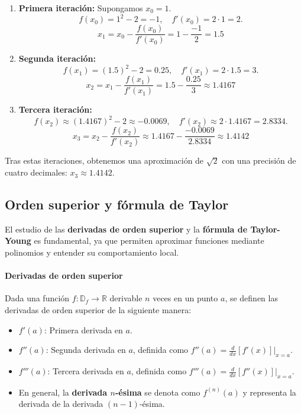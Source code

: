 \documentclass[12pt, a4paper]{article}
\theoremstyle{rioplatense}
\begin{document}
\begin{enumerate}
    \item \textbf{Primera iteración:}
    Supongamos \( x_0 = 1 \).
    \[
    f(x_0) = 1^2 - 2 = -1, \quad f'(x_0) = 2 \cdot 1 = 2.
    \]
    \[
    x_1 = x_0 - \frac{f(x_0)}{f'(x_0)} = 1 - \frac{-1}{2} = 1.5
    \]

    \item \textbf{Segunda iteración:}
    \[
    f(x_1) = (1.5)^2 - 2 = 0.25, \quad f'(x_1) = 2 \cdot 1.5 = 3.
    \]
    \[
    x_2 = x_1 - \frac{f(x_1)}{f'(x_1)} = 1.5 - \frac{0.25}{3} \approx 1.4167
    \]

    \item \textbf{Tercera iteración:}
    \[
    f(x_2) \approx (1.4167)^2 - 2 \approx -0.0069, \quad f'(x_2) \approx 2 \cdot 1.4167 = 2.8334.
    \]
    \[
    x_3 = x_2 - \frac{f(x_2)}{f'(x_2)} \approx 1.4167 - \frac{-0.0069}{2.8334} \approx 1.4142
    \]
\end{enumerate}

Tras estas iteraciones, obtenemos una aproximación de \( \sqrt{2} \) con una precisión de cuatro decimales: \( x_3 \approx 1.4142 \).

\subsection{Orden superior y fórmula de Taylor}

El estudio de las \textbf{derivadas de orden superior} y la \textbf{fórmula de Taylor-Young} es fundamental, ya que permiten aproximar funciones mediante polinomios y entender su comportamiento local.

\paragraph{Derivadas de orden superior}
Dada una función \( f: \mathbb{D}_f \to \mathbb{R} \) derivable \( n \) veces en un punto \( a \), se definen las derivadas de orden superior de la siguiente manera:
\begin{itemize}
    \item \( f'(a) \): Primera derivada en \( a \).
    \item \( f''(a) \): Segunda derivada en \( a \), definida como \( f''(a) = \frac{d}{dx}[f'(x)]\big|_{x=a} \).
    \item \( f'''(a) \): Tercera derivada en \( a \), definida como \( f'''(a) = \frac{d}{dx}[f''(x)]\big|_{x=a} \).
    \item En general, la \textbf{derivada \( n \)-ésima} se denota como \( f^{(n)}(a) \) y representa la derivada de la derivada \( (n-1) \)-ésima.
\end{itemize}
\end{document}
